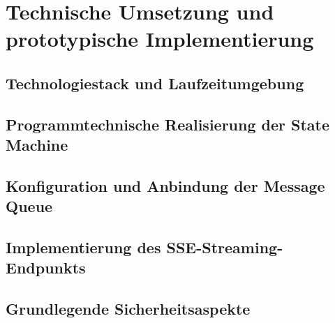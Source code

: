 \chapter{Technische Umsetzung und prototypische Implementierung}

\section{Technologiestack und Laufzeitumgebung}

\section{Programmtechnische Realisierung der State Machine}

\section{Konfiguration und Anbindung der Message Queue}

\section{Implementierung des SSE-Streaming-Endpunkts}

\section{Grundlegende Sicherheitsaspekte}
